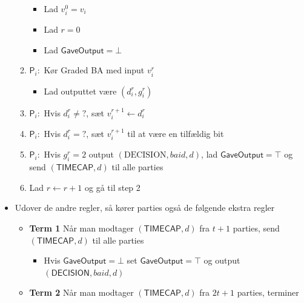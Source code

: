 \documentclass[a4, english]{article}
\begin{document}
\begin{itemize}
\begin{enumerate}
    \begin{itemize}
    	\item Lad $v_i^0 = v_i$
      \item Lad $r=0$
      \item Lad $\mathsf{GaveOutput} = \bot$  
    \end{itemize}
    \item $\mathsf P_i:$ Kør Graded BA med input $v_i^r$ 
    \begin{itemize}
      \item Lad outputtet være $(d_i^r, g_i^r)$ 
    \end{itemize}
    \item $\mathsf P_i:$ Hvis $d^r_i \ne ?$, sæt $v_i^{r+1} \leftarrow d_i^r$ 
    \item $\mathsf P_i:$ Hvis $d^r_i = ?$, sæt $v_i^{r+1}$ til at være en tilfældig bit 
    \item $\mathsf P_i:$ Hvis $g_i^r=2$ output $(\text{DECISION}, baid, d)$, lad $\mathsf{GaveOutput} = \top$ og send $(\mathsf{TIMECAP}, d)$ til alle parties
    \item Lad $r \leftarrow r+1$ og gå til step 2
  \end{enumerate} 
  \item Udover de andre regler, så kører parties også de følgende ekstra regler
  \begin{itemize}
  	\item \textbf{Term 1} Når man modtager $(\mathsf{TIMECAP}, d)$ fra $t+1$ parties, send $(\mathsf{TIMECAP}, d)$ til alle parties
    \begin{itemize}
    	\item Hvis $\mathsf{GaveOutput} = \bot$ set $\mathsf{GaveOutput} = \top$ og output $(\mathsf{DECISION}, baid, d)$
  \end{itemize}
      \item \textbf{Term 2} Når man modtager $(\mathsf{TIMECAP}, d)$ fra $2t+1$ parties, terminer
  \end{itemize}
\end{itemize} 
\end{document}
